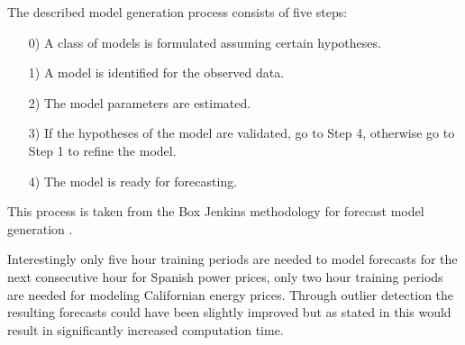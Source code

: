 The described model generation process consists of five steps: 

\begin{itemize}
	\item[0)] A class of models is formulated assuming certain hypotheses.
	\item[1)] A model is identified for the observed data.
	\item[2)] The model parameters are estimated.
	\item[3)] If the hypotheses of the model are validated, go to Step 4, otherwise go to Step 1 to refine the model.
	\item[4)] The model is ready for forecasting.
\end{itemize}

This process is taken from the Box Jenkins methodology for forecast model generation \cite{hibon1997arma}.

Interestingly only five hour training periods are needed to model forecasts for the next consecutive hour for Spanish power prices, only two hour training periods are needed for modeling Californian energy prices. 
Through outlier detection the resulting forecasts could have been slightly improved but as stated in \cite{contreras2003arima} this would result in significantly increased computation time. 

%
%
%
%




